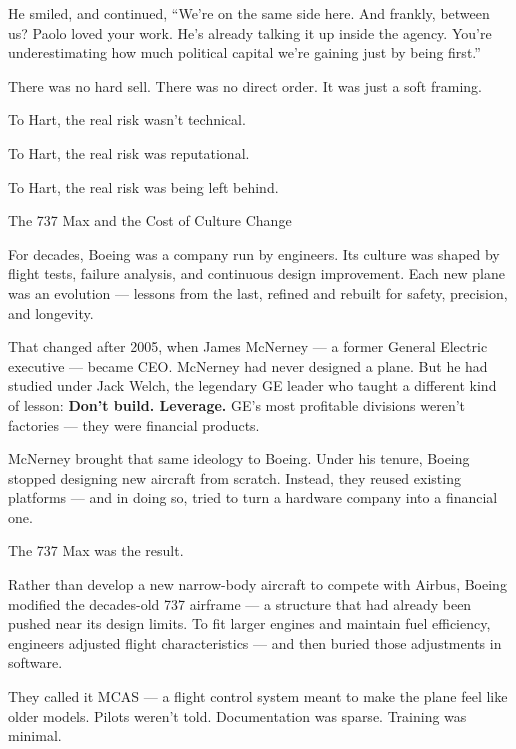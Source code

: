 He smiled, and continued, ``We’re on the same side here. And frankly, between us? Paolo loved your work. He’s already 
talking it up inside the agency. You’re underestimating how much political capital we’re gaining just by being first.''

There was no hard sell. There was no direct order.  It was just a soft framing.  

To Hart, the real risk wasn’t technical.  

To Hart, the real risk was reputational.  

To Hart, the real risk was being left behind.

\begin{HistoricalSidebar}{The 737 Max and the Cost of Culture Change}

  For decades, Boeing was a company run by engineers.  
  Its culture was shaped by flight tests, failure analysis, and continuous design improvement.  
  Each new plane was an evolution — lessons from the last, refined and rebuilt for safety, precision, and longevity.
  
  \medskip
  
  That changed after 2005, when James McNerney — a former General Electric executive — became CEO.  
  McNerney had never designed a plane. But he had studied under Jack Welch, the legendary GE leader who taught a 
  different kind of lesson:  
  \textbf{Don’t build. Leverage.}  
  GE’s most profitable divisions weren’t factories — they were financial products.
  
  \medskip
  
  McNerney brought that same ideology to Boeing.  
  Under his tenure, Boeing stopped designing new aircraft from scratch.  
  Instead, they reused existing platforms — and in doing so, tried to turn a hardware company into a financial one.
  
  \medskip
  
  The 737 Max was the result.
  
  \medskip
  
  Rather than develop a new narrow-body aircraft to compete with Airbus, Boeing modified the decades-old 737 airframe — 
  a structure that had already been pushed near its design limits.  
  To fit larger engines and maintain fuel efficiency, engineers adjusted flight characteristics — and then buried those 
  adjustments in software.
  
  \medskip
  
  They called it MCAS — a flight control system meant to make the plane feel like older models.  
  Pilots weren’t told. Documentation was sparse. Training was minimal.
  

\end{HistoricalSidebar}
